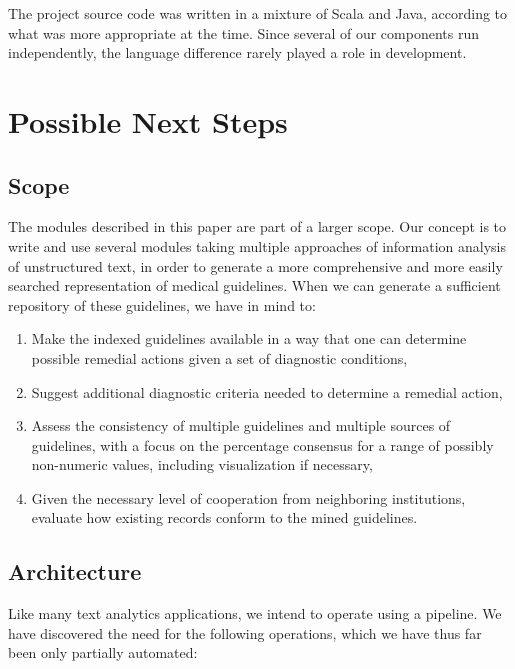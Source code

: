 \documentclass[12pt,letterpaper]{article}
\begin{document}
The project source code was written in a mixture of Scala and Java, according to what was more appropriate at the time. Since several of our components run independently, the language difference rarely played a role in development.

\section{Possible Next Steps}
\subsection*{Scope}

The modules described in this paper are part of a larger scope. Our concept is to write and use several modules taking multiple approaches of information analysis of unstructured text, in order  to generate a more comprehensive and more easily searched representation of medical guidelines. When we can generate a sufficient repository of these guidelines, we have in mind to:

\begin{enumerate}
\item Make the indexed guidelines available in a way that one can determine possible remedial actions given a set of diagnostic conditions,
\item Suggest additional diagnostic criteria needed to determine a remedial action,
\item Assess the consistency of multiple guidelines and multiple sources of guidelines, with a focus on the percentage consensus for a range of possibly non-numeric values, including visualization if necessary,
\item Given the necessary level of cooperation from neighboring institutions, evaluate how existing records conform to the mined guidelines.
\end{enumerate}

\subsection*{Architecture}
Like many text analytics applications, we intend to operate using a pipeline. We have discovered the need for the following operations, which we have thus far been only partially automated:
\end{document}
